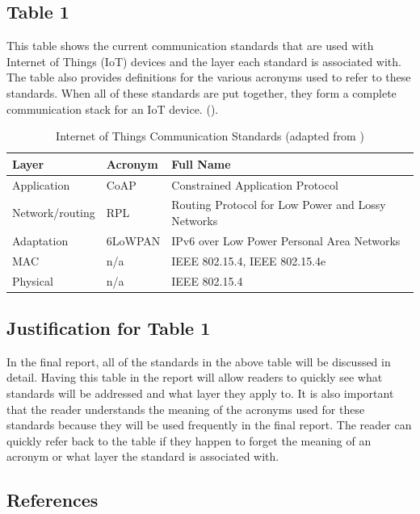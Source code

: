\documentclass[letterpaper, 12pt]{texMemo}
\begin{document}
\begin{flushleft}
\subsection*{Table 1}
This table shows the current communication standards that are used with Internet of Things (IoT) devices and the layer each standard is associated with. The table also provides
definitions for the various acronyms used to refer to these standards. When all of these standards are put together, they form a complete communication stack for an IoT
device. (\cite{Granjal7005393}).

\begin{table}[H]
\begin{tabular}{ | l | l | p{9cm} |}
\hline
Layer & Acronym & Full Name \\ \hline
Application & CoAP & Constrained Application Protocol \\ \hline
Network/routing & RPL & Routing Protocol for Low Power and Lossy Networks \\ \hline
Adaptation & 6LoWPAN & IPv6 over Low Power Personal Area Networks \\ \hline
MAC & n/a & IEEE 802.15.4, IEEE 802.15.4e \\ \hline
Physical & n/a & IEEE 802.15.4 \\ \hline
\end{tabular}
\caption{Internet of Things Communication Standards (adapted from \cite{Granjal7005393})}
\end{table}

\subsection*{Justification for Table 1}
In the final report, all of the standards in the above table will be discussed in detail. Having this table in the report will allow readers to quickly see what standards
will be addressed and what layer they apply to. It is also important
that the reader understands the meaning of the acronyms used for these standards because they will be used frequently in the final report. The reader can quickly refer back to the
table if they happen to forget the meaning of an acronym or what layer the standard is associated with. 

\newpage
\subsection*{References}
\\
~\newline
{}
\end{flushleft}
\end{document}
